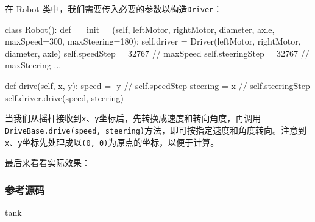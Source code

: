 在 Robot 类中，我们需要传入必要的参数以构造\texttt{Driver}：

\begin{pythoncode}
class Robot():
    def __init__(self, leftMotor, rightMotor, diameter, axle, maxSpeed=300, maxSteering=180):
        self.driver = Driver(leftMotor, rightMotor, diameter, axle)
        self.speedStep = 32767 // maxSpeed
        self.steeringStep = 32767 // maxSteering
        ...

    def drive(self, x, y):
        speed = -y // self.speedStep
        steering = x // self.steeringStep
        self.driver.drive(speed, steering)
\end{pythoncode}

当我们从摇杆接收到\texttt{x}、\texttt{y}坐标后，先转换成速度和转向角度，再调用\texttt{DriveBase.drive(speed,\ steering)}方法，即可按指定速度和角度转向。注意到\texttt{x}、\texttt{y}坐标先处理成以\texttt{(0,\ 0)}为原点的坐标，以便于计算。

最后来看看实际效果：

\hypertarget{ux53c2ux8003ux6e90ux7801}{%
\subsubsection{参考源码}\label{ux53c2ux8003ux6e90ux7801}}

\href{https://github.com/michaelliao/learn-python3/tree/master/samples/micropython/tank}{tank}

